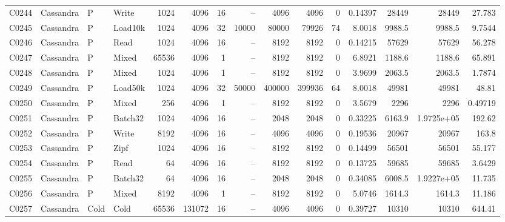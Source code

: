 \begin{landscape}
\begin{longtable}{llllrrrrrrrrrrr}
C0244 & Cassandra & P & Write & 1024 & 4096 & 16 & -- & 4096 & 4096 & 0 & 0.14397 & 28449 & 28449 & 27.783\\
C0245 & Cassandra & P & Load10k & 1024 & 4096 & 32 & 10000 & 80000 & 79926 & 74 & 8.0018 & 9988.5 & 9988.5 & 9.7544\\
C0246 & Cassandra & P & Read & 1024 & 4096 & 16 & -- & 8192 & 8192 & 0 & 0.14215 & 57629 & 57629 & 56.278\\
C0247 & Cassandra & P & Mixed & 65536 & 4096 & 1 & -- & 8192 & 8192 & 0 & 6.8921 & 1188.6 & 1188.6 & 65.891\\
C0248 & Cassandra & P & Mixed & 1024 & 4096 & 1 & -- & 8192 & 8192 & 0 & 3.9699 & 2063.5 & 2063.5 & 1.7874\\
C0249 & Cassandra & P & Load50k & 1024 & 4096 & 32 & 50000 & 400000 & 399936 & 64 & 8.0018 & 49981 & 49981 & 48.81\\
C0250 & Cassandra & P & Mixed & 256 & 4096 & 1 & -- & 8192 & 8192 & 0 & 3.5679 & 2296 & 2296 & 0.49719\\
C0251 & Cassandra & P & Batch32 & 1024 & 4096 & 16 & -- & 2048 & 2048 & 0 & 0.33225 & 6163.9 & 1.9725e+05 & 192.62\\
C0252 & Cassandra & P & Write & 8192 & 4096 & 16 & -- & 4096 & 4096 & 0 & 0.19536 & 20967 & 20967 & 163.8\\
C0253 & Cassandra & P & Zipf & 1024 & 4096 & 16 & -- & 8192 & 8192 & 0 & 0.14499 & 56501 & 56501 & 55.177\\
C0254 & Cassandra & P & Read & 64 & 4096 & 16 & -- & 8192 & 8192 & 0 & 0.13725 & 59685 & 59685 & 3.6429\\
C0255 & Cassandra & P & Batch32 & 64 & 4096 & 16 & -- & 2048 & 2048 & 0 & 0.34085 & 6008.5 & 1.9227e+05 & 11.735\\
C0256 & Cassandra & P & Mixed & 8192 & 4096 & 1 & -- & 8192 & 8192 & 0 & 5.0746 & 1614.3 & 1614.3 & 11.186\\
C0257 & Cassandra & Cold & Cold & 65536 & 131072 & 16 & -- & 4096 & 4096 & 0 & 0.39727 & 10310 & 10310 & 644.41\\
\end{longtable}
\normalsize
\end{landscape}


